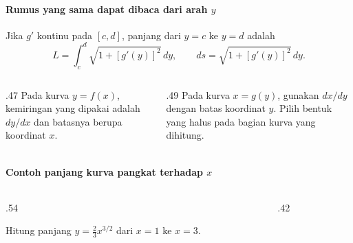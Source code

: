 \documentclass{../../kalkulus-ppt}
\begin{document}
\begin{frame}{\insertsection}
    \framesubtitle{Rumus yang sama dapat dibaca dari arah $y$}
    \begin{teorema}[Panjang kurva $x=g(y)$]
        Jika $g'$ kontinu pada $[c,d]$, panjang dari $y=c$ ke $y=d$ adalah
        \[
            L=\int_c^d\sqrt{1+[g'(y)]^2}\,dy,\qquad
            ds=\sqrt{1+[g'(y)]^2}\,dy.
        \]
    \end{teorema}
    \begin{columns}[t,onlytextwidth]
        \begin{column}{.47\textwidth}
            Pada kurva $y=f(x)$, kemiringan yang dipakai adalah $dy/dx$
            dan batasnya berupa koordinat $x$.
        \end{column}
        \begin{column}{.49\textwidth}
            Pada kurva $x=g(y)$, gunakan $dx/dy$ dengan batas koordinat $y$.
            Pilih bentuk yang halus pada bagian kurva yang dihitung.
        \end{column}
    \end{columns}
\end{frame}

\begin{frame}{\insertsection}
    \framesubtitle{Contoh panjang kurva pangkat terhadap $x$}
    \begin{columns}[c,onlytextwidth]
        \begin{column}{.54\textwidth}
            \begin{contoh}
                Hitung panjang $y=\tfrac23x^{3/2}$ dari $x=1$ ke $x=3$.
            \end{contoh}
        \end{column}
        \begin{column}{.42\textwidth}
            \centering
        \end{column}
    \end{columns}
\end{frame}
\end{document}

